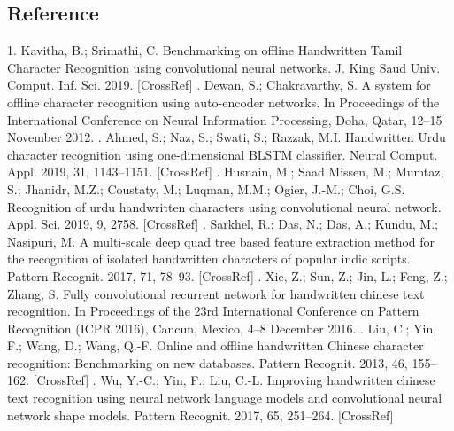 \subsection{Reference}
1. Kavitha, B.; Srimathi, C. Benchmarking on offline Handwritten Tamil Character Recognition using convolutional
neural networks. J. King Saud Univ. Comput. Inf. Sci. 2019. [CrossRef]
\newline 
{}. Dewan, S.; Chakravarthy, S. A system for offline character recognition using auto-encoder networks. In Proceedings
of the International Conference on Neural Information Processing, Doha, Qatar, 12–15 November 2012.
\newline 
{}. Ahmed, S.; Naz, S.; Swati, S.; Razzak, M.I. Handwritten Urdu character recognition using one-dimensional BLSTM
classifier. Neural Comput. Appl. 2019, 31, 1143–1151. [CrossRef]
\newline 
{}. Husnain, M.; Saad Missen, M.; Mumtaz, S.; Jhanidr, M.Z.; Coustaty, M.; Luqman, M.M.; Ogier, J.-M.; Choi, G.S.
Recognition of urdu handwritten characters using convolutional neural network. Appl. Sci. 2019, 9, 2758. [CrossRef]
\newline 
{}. Sarkhel, R.; Das, N.; Das, A.; Kundu, M.; Nasipuri, M. A multi-scale deep quad tree based feature extraction method
for the recognition of isolated handwritten characters of popular indic scripts. Pattern Recognit. 2017, 71, 78–93.
[CrossRef]\newline 
{}. Xie, Z.; Sun, Z.; Jin, L.; Feng, Z.; Zhang, S. Fully convolutional recurrent network for handwritten chinese text
recognition. In Proceedings of the 23rd International Conference on Pattern Recognition (ICPR 2016), Cancun,
Mexico, 4–8 December 2016.
\newline 
{}. Liu, C.; Yin, F.; Wang, D.; Wang, Q.-F. Online and offline handwritten Chinese character recognition: Benchmarking
on new databases. Pattern Recognit. 2013, 46, 155–162. [CrossRef]
\newline 
{}. Wu, Y.-C.; Yin, F.; Liu, C.-L. Improving handwritten chinese text recognition using neural network language models
and convolutional neural network shape models. Pattern Recognit. 2017, 65, 251–264. [CrossRef]
\newline 
